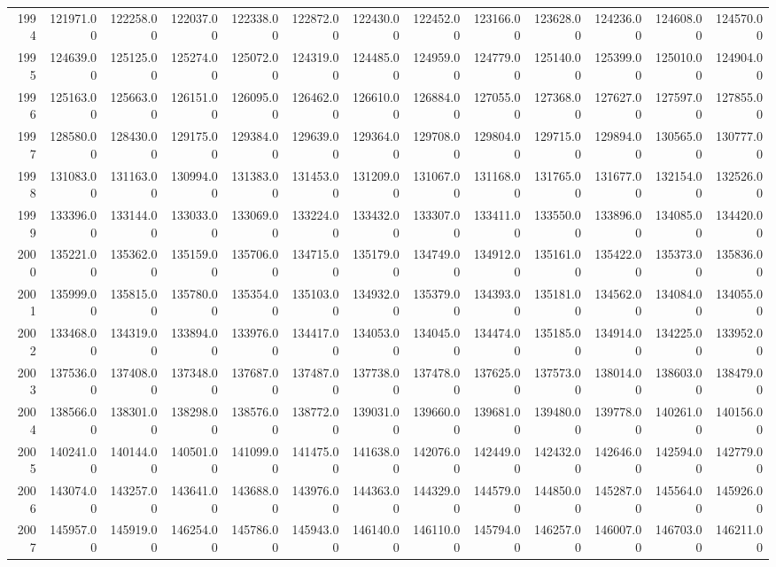 \begin{longtable}{rrrrrrrrrrrrr}
  1994 & 121971.00 & 122258.00 & 122037.00 & 122338.00 & 122872.00 & 122430.00 & 122452.00 & 123166.00 & 123628.00 & 124236.00 & 124608.00 & 124570.00 \\ 
  1995 & 124639.00 & 125125.00 & 125274.00 & 125072.00 & 124319.00 & 124485.00 & 124959.00 & 124779.00 & 125140.00 & 125399.00 & 125010.00 & 124904.00 \\ 
  1996 & 125163.00 & 125663.00 & 126151.00 & 126095.00 & 126462.00 & 126610.00 & 126884.00 & 127055.00 & 127368.00 & 127627.00 & 127597.00 & 127855.00 \\ 
  1997 & 128580.00 & 128430.00 & 129175.00 & 129384.00 & 129639.00 & 129364.00 & 129708.00 & 129804.00 & 129715.00 & 129894.00 & 130565.00 & 130777.00 \\ 
  1998 & 131083.00 & 131163.00 & 130994.00 & 131383.00 & 131453.00 & 131209.00 & 131067.00 & 131168.00 & 131765.00 & 131677.00 & 132154.00 & 132526.00 \\ 
  1999 & 133396.00 & 133144.00 & 133033.00 & 133069.00 & 133224.00 & 133432.00 & 133307.00 & 133411.00 & 133550.00 & 133896.00 & 134085.00 & 134420.00 \\ 
  2000 & 135221.00 & 135362.00 & 135159.00 & 135706.00 & 134715.00 & 135179.00 & 134749.00 & 134912.00 & 135161.00 & 135422.00 & 135373.00 & 135836.00 \\ 
  2001 & 135999.00 & 135815.00 & 135780.00 & 135354.00 & 135103.00 & 134932.00 & 135379.00 & 134393.00 & 135181.00 & 134562.00 & 134084.00 & 134055.00 \\ 
  2002 & 133468.00 & 134319.00 & 133894.00 & 133976.00 & 134417.00 & 134053.00 & 134045.00 & 134474.00 & 135185.00 & 134914.00 & 134225.00 & 133952.00 \\ 
  2003 & 137536.00 & 137408.00 & 137348.00 & 137687.00 & 137487.00 & 137738.00 & 137478.00 & 137625.00 & 137573.00 & 138014.00 & 138603.00 & 138479.00 \\ 
  2004 & 138566.00 & 138301.00 & 138298.00 & 138576.00 & 138772.00 & 139031.00 & 139660.00 & 139681.00 & 139480.00 & 139778.00 & 140261.00 & 140156.00 \\ 
  2005 & 140241.00 & 140144.00 & 140501.00 & 141099.00 & 141475.00 & 141638.00 & 142076.00 & 142449.00 & 142432.00 & 142646.00 & 142594.00 & 142779.00 \\ 
  2006 & 143074.00 & 143257.00 & 143641.00 & 143688.00 & 143976.00 & 144363.00 & 144329.00 & 144579.00 & 144850.00 & 145287.00 & 145564.00 & 145926.00 \\ 
  2007 & 145957.00 & 145919.00 & 146254.00 & 145786.00 & 145943.00 & 146140.00 & 146110.00 & 145794.00 & 146257.00 & 146007.00 & 146703.00 & 146211.00 \\ 

\end{longtable}
